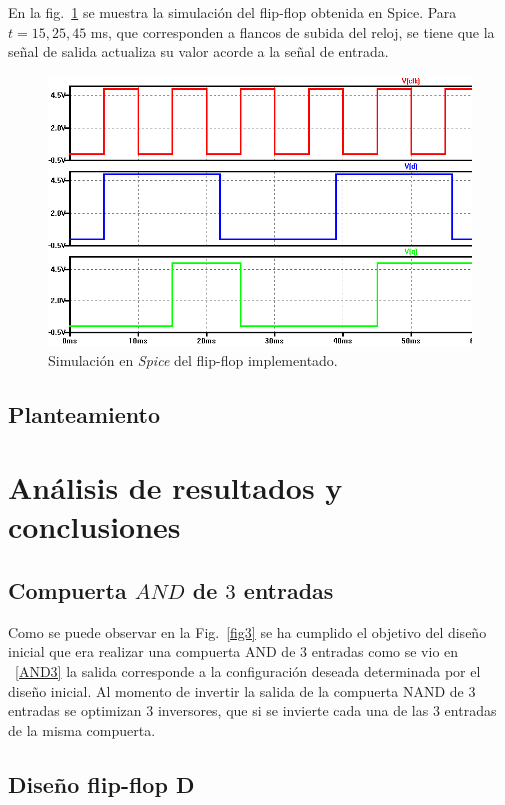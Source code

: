 \documentclass[twocolumn]{IEEEtran}
\begin{document}
\noindent
En la fig.~\ref{ffsim} se muestra la simulación del flip-flop obtenida en Spice. Para $t=15,25,45$ ms, que corresponden a flancos de subida del reloj, se tiene que la señal de salida actualiza su valor acorde a la señal de entrada.
\begin{figure}[H]
  \centering
    \includegraphics[scale=0.3]{./pics/sim_ff2.png}
      \caption{Simulación en \textit{Spice} del flip-flop implementado.}
	\label{ffsim}
\end{figure}

\subsection{Planteamiento}
\noindent


\section{Análisis de resultados y conclusiones}
\subsection{Compuerta $AND$ de $3$ entradas}
\noindent
Como se puede observar en la Fig.~\ref{fig3} se ha cumplido el objetivo del diseño inicial que era realizar una compuerta AND de $3$ entradas como se vio en ~\ref{AND3} la salida corresponde a la configuración deseada determinada por el diseño inicial. Al momento de invertir la salida de la compuerta NAND de $3$ entradas se optimizan 3 inversores, que si se invierte cada una de las $3$ entradas de la misma compuerta.

\subsection{Diseño flip-flop D}
\noindent
\end{document}
